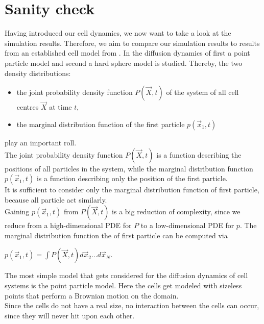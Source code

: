 \section{Sanity check}
Having introduced our cell dynamics, we now want to take a look at the simulation results.
Therefore, we aim to compare our simulation results to results from an established cell model from \cite{Bruna2012}. 
In \cite{Bruna2012} the diffusion dynamics of first a point particle model and second a hard sphere model is studied. 
Thereby, the two density distributions:
\begin{itemize}
    \item the joint probability density function $P(\vec{X}, t)$ of the system of all cell centres $\vec{X}$ at time $t$,
    \item the marginal distribution function of the first particle $p(\vec{x}_1, t)$
\end{itemize}
play an important roll. \\
The joint probability density function $P(\vec{X}, t)$ is a function describing the positions of all particles in the system, while the marginal distribution function $p(\vec{x}_1, t)$ is a function describing only the position of the first particle. \\
It is sufficient to consider only the marginal distribution function of first particle, because all particle act similarly. \\ 
Gaining $p(\vec{x}_1, t)$ from $P(\vec{X}, t)$ is a big reduction of complexity, since we reduce from a high-dimensional PDE for $P$ to a low-dimensional PDE for $p$. 
The marginal distribution function the of first particle can be computed via
\begin{center}
    $
    p(\vec{x}_1, t) = \int P(\vec{X}, t) d\vec{x}_2 \dots  d\vec{x}_N.
    $
\end{center} 

The most simple model that gets considered for the diffusion dynamics of cell systems is the point particle model. 
Here the cells get modeled with sizeless points that perform a Brownian motion on the domain. \\
Since the cells do not have a real size, no interaction between the cells can occur, since they will never hit upon each other.  

